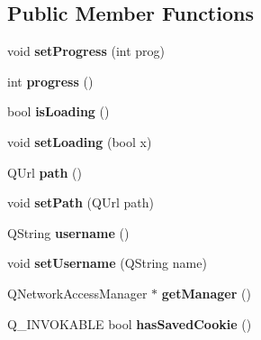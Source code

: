 \subsection*{Public Member Functions}
\begin{DoxyCompactItemize}
\item 
\hypertarget{classHttpManager_a9206d907e4d69e607513f8098f00426b}{void {\bfseries set\-Progress} (int prog)}\label{classHttpManager_a9206d907e4d69e607513f8098f00426b}

\item 
\hypertarget{classHttpManager_a4d54d3e5b0af4ab49d9141674bee19e5}{int {\bfseries progress} ()}\label{classHttpManager_a4d54d3e5b0af4ab49d9141674bee19e5}

\item 
\hypertarget{classHttpManager_ad4d544319accae90e7d85cc9f57d360f}{bool {\bfseries is\-Loading} ()}\label{classHttpManager_ad4d544319accae90e7d85cc9f57d360f}

\item 
\hypertarget{classHttpManager_ac925a4bfdf4f7ba8525051fbe278800c}{void {\bfseries set\-Loading} (bool x)}\label{classHttpManager_ac925a4bfdf4f7ba8525051fbe278800c}

\item 
\hypertarget{classHttpManager_a3b8d9619b77e2c552e300d70564b3d7b}{Q\-Url {\bfseries path} ()}\label{classHttpManager_a3b8d9619b77e2c552e300d70564b3d7b}

\item 
\hypertarget{classHttpManager_ab9ccf94ca733e7a3308def32ec2216c5}{void {\bfseries set\-Path} (Q\-Url path)}\label{classHttpManager_ab9ccf94ca733e7a3308def32ec2216c5}

\item 
\hypertarget{classHttpManager_a81cf358de7d340343afe563e8d8bea55}{Q\-String {\bfseries username} ()}\label{classHttpManager_a81cf358de7d340343afe563e8d8bea55}

\item 
\hypertarget{classHttpManager_a00bfa7d52db2e6f4aee40ef66af1188f}{void {\bfseries set\-Username} (Q\-String name)}\label{classHttpManager_a00bfa7d52db2e6f4aee40ef66af1188f}

\item 
\hypertarget{classHttpManager_aab5b2b37ca0a08fcc0ce0fb69996df34}{Q\-Network\-Access\-Manager $\ast$ {\bfseries get\-Manager} ()}\label{classHttpManager_aab5b2b37ca0a08fcc0ce0fb69996df34}

\item 
\hypertarget{classHttpManager_ae8be30969ab90769d320474cba273cea}{Q\-\_\-\-I\-N\-V\-O\-K\-A\-B\-L\-E bool {\bfseries has\-Saved\-Cookie} ()}\label{classHttpManager_ae8be30969ab90769d320474cba273cea}


\end{DoxyCompactItemize}

